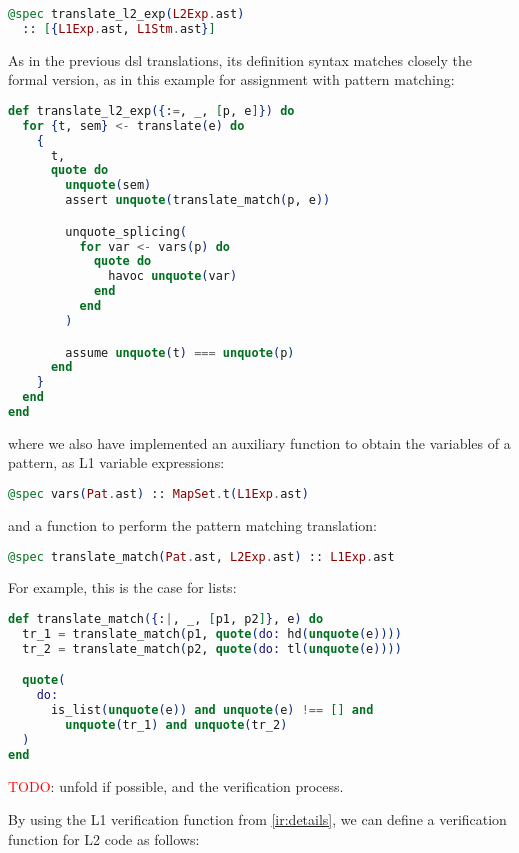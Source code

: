 \begin{lstlisting}[language=elixir,numbers=none,frame=none]
@spec translate_l2_exp(L2Exp.ast) 
  :: [{L1Exp.ast, L1Stm.ast}]
\end{lstlisting}

As in the previous \gls{dsl} translations, its definition syntax matches closely the 
formal version, as in this example for assignment with pattern matching:

\begin{lstlisting}[language=elixir,numbers=none,frame=none]
def translate_l2_exp({:=, _, [p, e]}) do
  for {t, sem} <- translate(e) do
    {
      t,
      quote do
        unquote(sem)
        assert unquote(translate_match(p, e))

        unquote_splicing(
          for var <- vars(p) do
            quote do
              havoc unquote(var)
            end
          end
        )

        assume unquote(t) === unquote(p)
      end
    }
  end
end
\end{lstlisting}

where we also have implemented an auxiliary function to obtain the variables of a 
pattern, as L1 variable expressions:

\begin{lstlisting}[language=elixir,numbers=none,frame=none]
@spec vars(Pat.ast) :: MapSet.t(L1Exp.ast)
\end{lstlisting}

and a function to perform the pattern matching translation:

\begin{lstlisting}[language=elixir,numbers=none,frame=none]
@spec translate_match(Pat.ast, L2Exp.ast) :: L1Exp.ast
\end{lstlisting}

For example, this is the case for lists:

\begin{lstlisting}[language=elixir,numbers=none,frame=none]
def translate_match({:|, _, [p1, p2]}, e) do
  tr_1 = translate_match(p1, quote(do: hd(unquote(e))))
  tr_2 = translate_match(p2, quote(do: tl(unquote(e))))

  quote(
    do:
      is_list(unquote(e)) and unquote(e) !== [] and
        unquote(tr_1) and unquote(tr_2)
  )
end
\end{lstlisting}

\textcolor{red}{TODO}: unfold if possible, and the verification process.

By using the L1 verification function from \ref{ir:details}, we can define 
a verification function for L2 code as follows:

